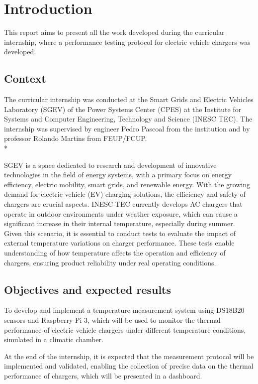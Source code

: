 \section{Introduction}
This report aims to present all the work developed during the curricular internship, where a performance testing protocol for electric vehicle chargers was developed.

\subsection{Context}
The curricular internship was conducted at the Smart Grids and Electric Vehicles Laboratory (SGEV) of the Power Systems Center (CPES) at the 
Institute for Systems and Computer Engineering, Technology and Science (INESC TEC). The internship was supervised by engineer Pedro Pascoal from 
the institution and by professor Rolando Martins from FEUP/FCUP. \\*

\noindent SGEV is a space dedicated to research and development of innovative technologies in the field of energy systems, with a primary focus on energy 
efficiency, electric mobility, smart grids, and renewable energy.
With the growing demand for electric vehicle (EV) charging solutions, the efficiency and safety of chargers are crucial aspects. INESC TEC currently develops 
AC chargers that operate in outdoor environments under weather exposure, which can cause a significant increase in their internal temperature, 
especially during summer. Given this scenario, it is essential to conduct tests to evaluate the impact of external temperature variations on 
charger performance. These tests enable understanding of how temperature affects the operation and efficiency of chargers, ensuring 
product reliability under real operating conditions.

\subsection{Objectives and expected results}
To develop and implement a temperature measurement system using DS18B20 sensors and Raspberry Pi 3, which will be used to monitor the thermal 
performance of electric vehicle chargers under different temperature conditions, simulated in a climatic chamber.

At the end of the internship, it is expected that the measurement protocol will be implemented and validated, enabling the collection of precise data on 
the thermal performance of chargers, which will be presented in a dashboard.

